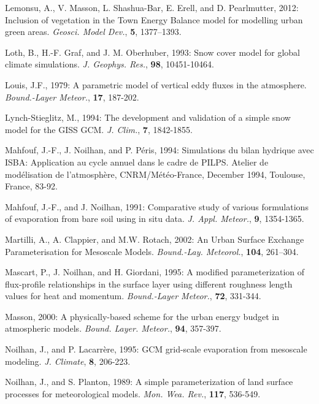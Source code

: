 \begin{description}
\item
Lemonsu, A., V. Masson, L. Shashua-Bar, E. Erell, and D. Pearlmutter, 2012:
Inclusion of vegetation in the Town Energy Balance model for modelling urban green areas.
{\em Geosci. Model Dev.}, {\bf 5}, 1377–1393.

\item
Loth, B.,
H.-F. Graf, and J. M. Oberhuber, 1993:
Snow cover model for global climate simulations.
{\em J. Geophys. Res.},
{\bf 98},
10451-10464.

\item
Louis, J.F., 1979:
A parametric model of vertical eddy fluxes in the atmosphere.
{\em Bound.-Layer Meteor.},
{\bf 17},
187-202.

\item
Lynch-Stieglitz, M., 1994: The development and validation
of a simple snow model for the GISS GCM.
{\em J. Clim.},
{\bf 7},
1842-1855.

\item
Mahfouf, J.-F., J. Noilhan, and P. P\'eris, 1994:
Simulations du bilan hydrique avec ISBA:  Application
au cycle annuel dans le cadre de PILPS.
Atelier de mod\'elisation de l'atmosph\`ere,
CNRM/M\'et\'eo-France,
December 1994, Toulouse, France, 83-92.

\item
Mahfouf, J.-F., and J. Noilhan, 1991:
Comparative study of various formulations of evaporation
from bare soil using in situ data.
{\em J. Appl. Meteor.}, {\bf 9}, 1354-1365.

\item
Martilli, A., A. Clappier, and M.W. Rotach, 2002:
An Urban Surface Exchange Parameterisation for Mesoscale Models.
{\em Bound.-Lay. Meteorol.}, {\bf 104}, 261–304.

\item
Mascart, P., J. Noilhan, and H. Giordani, 1995:
A modified parameterization of flux-profile relationships
in the surface layer using different roughness length
values for heat and momentum.
{\em Bound.-Layer Meteor.}, {\bf 72}, 331-344.

\item
Masson, 2000:
A physically-based scheme for the urban energy budget in atmospheric models.
{\it Bound. Layer. Meteor.},  {\bf 94}, 357-397.

\item
Noilhan, J., and P. Lacarr\`ere, 1995:
GCM grid-scale evaporation from mesoscale modeling.
{\em J. Climate}, {\bf 8}, 206-223. 

\item
Noilhan, J., and S. Planton, 1989:
A simple parameterization of land surface processes for meteorological models.
{\em Mon. Wea. Rev.}, {\bf 117}, 536-549.


\end{description}
